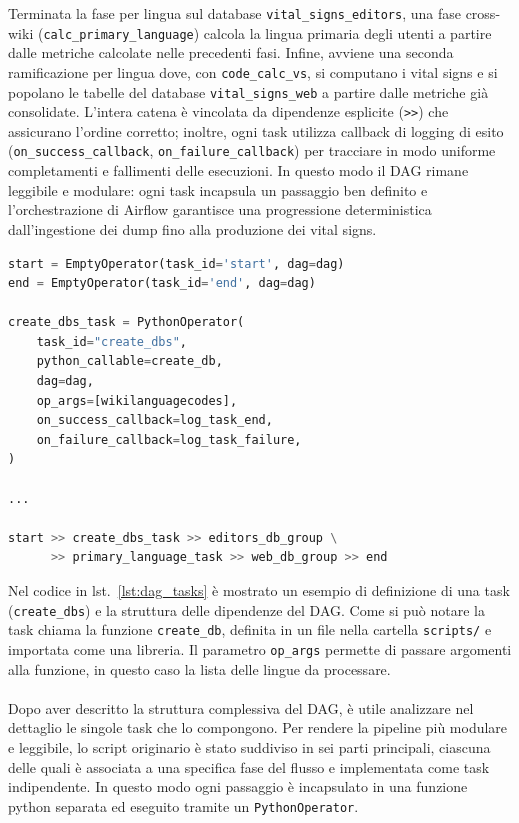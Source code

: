 Terminata la fase per lingua sul database \texttt{vital\_signs\_editors}, una fase cross-wiki (\texttt{calc\_primary\allowbreak\_language})
 calcola la lingua primaria degli utenti a partire dalle metriche calcolate nelle precedenti fasi.
Infine, avviene una seconda ramificazione per lingua dove, con \texttt{code\_calc\_vs}, si computano i vital signs e si popolano le tabelle del database \texttt{vital\_signs\_web} a partire dalle metriche già consolidate.
L’intera catena è vincolata da dipendenze esplicite (\texttt{>>}) che assicurano l’ordine corretto; inoltre, ogni task utilizza callback di logging di esito (\texttt{on\_success\_callback}, \texttt{on\_failure\_callback}) per tracciare in modo uniforme completamenti e fallimenti delle esecuzioni.
In questo modo il DAG rimane leggibile e modulare: ogni task incapsula un passaggio ben definito e l’orchestrazione di Airflow garantisce una progressione deterministica dall’ingestione dei dump fino alla produzione dei vital signs.


\begin{lstlisting}[language=Python, caption={Esempio di definizione di una task e dipendenze del DAG}, label=lst:dag_tasks, basicstyle=\scriptsize\ttfamily]
start = EmptyOperator(task_id='start', dag=dag)
end = EmptyOperator(task_id='end', dag=dag)

create_dbs_task = PythonOperator(
    task_id="create_dbs",
    python_callable=create_db,
    dag=dag,
    op_args=[wikilanguagecodes],
    on_success_callback=log_task_end,
    on_failure_callback=log_task_failure,
)

...

start >> create_dbs_task >> editors_db_group \
      >> primary_language_task >> web_db_group >> end
\end{lstlisting}

Nel codice in lst.~\ref{lst:dag_tasks} è mostrato un esempio di definizione di una task (\texttt{create\_dbs}) e la struttura delle dipendenze del DAG.
Come si può notare la task chiama la funzione \texttt{create\_db}, definita in un file nella cartella \texttt{scripts/} e importata come una libreria.
Il parametro \texttt{op\_args} permette di passare argomenti alla funzione, in questo caso la lista delle lingue da processare.
\paragraph{}
Dopo aver descritto la struttura complessiva del DAG, è utile analizzare nel dettaglio le singole task che lo compongono.
Per rendere la pipeline più modulare e leggibile, lo script originario è stato suddiviso in sei parti principali, ciascuna delle quali è associata a una specifica fase del flusso e implementata come task indipendente. In questo modo ogni passaggio è incapsulato in una funzione python separata ed eseguito tramite un \texttt{PythonOperator}.

